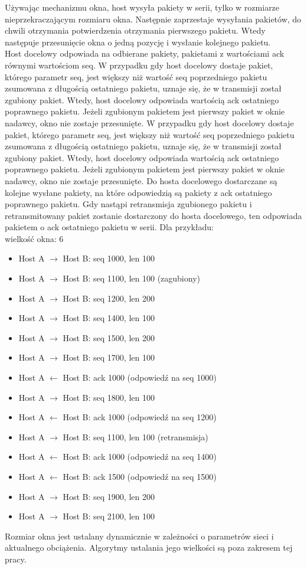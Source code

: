 \documentclass[a4paper,12pt,oneside]{book}
\begin{document}
			Używając mechanizmu okna, host wysyła pakiety w serii, tylko w rozmiarze nieprzekraczającym rozmiaru okna.
			Następnie zaprzestaje wysyłania pakietów, do chwili otrzymania potwierdzenia otrzymania pierwszego pakietu.
			Wtedy następuje przesunięcie okna o jedną pozycję i wysłanie kolejnego pakietu.\\
			Host docelowy odpowiada na odbierane pakiety, pakietami z wartościami ack równymi wartościom seq.
			W przypadku gdy host docelowy dostaje pakiet, którego parametr seq, jest większy niż wartość seq poprzedniego pakietu zsumowana z długością ostatniego pakietu, uznaje się, że w transmisji został zgubiony pakiet.
			Wtedy, host docelowy odpowiada wartością ack ostatniego poprawnego pakietu.
			Jeżeli zgubionym pakietem jest pierwszy pakiet w oknie nadawcy, okno nie zostaje przesunięte.
			W przypadku gdy host docelowy dostaje pakiet, którego parametr seq, jest większy niż wartość seq poprzedniego pakietu zsumowana z długością ostatniego pakietu, uznaje się, że w transmisji został zgubiony pakiet.
			Wtedy, host docelowy odpowiada wartością ack ostatniego poprawnego pakietu.
			Jeżeli zgubionym pakietem jest pierwszy pakiet w oknie nadawcy, okno nie zostaje przesunięte.
			Do hosta docelowego dostarczane są kolejne wysłane pakiety, na które odpowiedzią są pakiety z ack ostatniego poprawnego pakietu.
			Gdy nastąpi retransmisja zgubionego pakietu i retransmitowany pakiet zostanie dostarczony do hosta docelowego, ten odpowiada pakietem o ack ostatniego pakietu w serii. Dla przykładu:\\
			wielkość okna: 6
			\begin{itemize}
			\item Host A $\rightarrow$ Host B: seq 1000, len 100
			\item Host A $\rightarrow$ Host B: seq 1100, len 100 (zagubiony)
			\item Host A $\rightarrow$ Host B: seq 1200, len 200
			\item Host A $\rightarrow$ Host B: seq 1400, len 100
			\item Host A $\rightarrow$ Host B: seq 1500, len 200
			\item Host A $\rightarrow$ Host B: seq 1700, len 100
			\item Host A $\leftarrow$ Host B: ack 1000 (odpowiedź na seq 1000)
			\item Host A $\rightarrow$ Host B: seq 1800, len 100
			\item Host A $\leftarrow$ Host B: ack 1000 (odpowiedź na seq 1200)
			\item Host A $\rightarrow$ Host B: seq 1100, len 100 (retransmisja)
			\item Host A $\leftarrow$ Host B: ack 1000 (odpowiedź na seq 1400)
			\item Host A $\leftarrow$ Host B: ack 1500 (odpowiedź na seq 1500)
			\item Host A $\rightarrow$ Host B: seq 1900, len 200
			\item Host A $\rightarrow$ Host B: seq 2100, len 100
			\end{itemize}
			Rozmiar okna jest ustalany dynamicznie w zależności o parametrów sieci i aktualnego obciążenia.
			Algorytmy ustalania jego wielkości są poza zakresem tej pracy.
\end{document}
